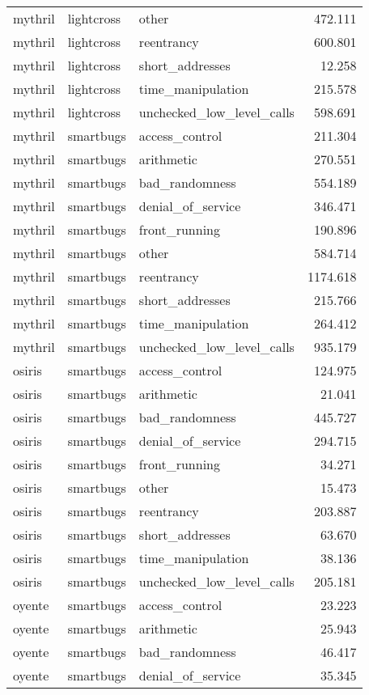 \begin{tabular}[t]{lllr}
\addlinespace
mythril & lightcross & other & 472.111\\
mythril & lightcross & reentrancy & 600.801\\
mythril & lightcross & short\_addresses & 12.258\\
mythril & lightcross & time\_manipulation & 215.578\\
mythril & lightcross & unchecked\_low\_level\_calls & 598.691\\
\addlinespace
mythril & smartbugs & access\_control & 211.304\\
mythril & smartbugs & arithmetic & 270.551\\
mythril & smartbugs & bad\_randomness & 554.189\\
mythril & smartbugs & denial\_of\_service & 346.471\\
mythril & smartbugs & front\_running & 190.896\\
\addlinespace
mythril & smartbugs & other & 584.714\\
mythril & smartbugs & reentrancy & 1174.618\\
mythril & smartbugs & short\_addresses & 215.766\\
mythril & smartbugs & time\_manipulation & 264.412\\
mythril & smartbugs & unchecked\_low\_level\_calls & 935.179\\
\addlinespace
osiris & smartbugs & access\_control & 124.975\\
osiris & smartbugs & arithmetic & 21.041\\
osiris & smartbugs & bad\_randomness & 445.727\\
osiris & smartbugs & denial\_of\_service & 294.715\\
osiris & smartbugs & front\_running & 34.271\\
\addlinespace
osiris & smartbugs & other & 15.473\\
osiris & smartbugs & reentrancy & 203.887\\
osiris & smartbugs & short\_addresses & 63.670\\
osiris & smartbugs & time\_manipulation & 38.136\\
osiris & smartbugs & unchecked\_low\_level\_calls & 205.181\\
\addlinespace
oyente & smartbugs & access\_control & 23.223\\
oyente & smartbugs & arithmetic & 25.943\\
oyente & smartbugs & bad\_randomness & 46.417\\
oyente & smartbugs & denial\_of\_service & 35.345\\

\end{tabular}
